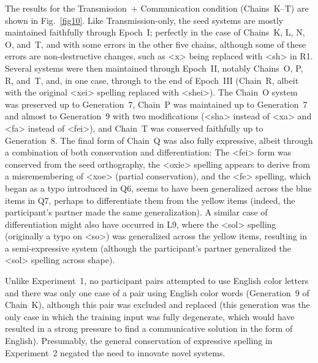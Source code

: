 \documentclass[doc,biblatex]{apa7}
\begin{document}
The results for the Transmission~+ Communication condition (Chains~K--T) are shown in Fig.~\ref{fig10}. Like Transmission-only, the seed systems are mostly maintained faithfully through Epoch~I; perfectly in the case of Chains~K, L, N, O, and~T, and with some errors in the other five chains, although some of these errors are non-destructive changes, such as <x> being replaced with <sh> in R1. Several systems were then maintained through Epoch~II, notably Chains~O, P, R, and~T, and, in one case, through to the end of Epoch~III (Chain~R, albeit with the original <xei> spelling replaced with <shei>). The Chain~O system was preserved up to Generation~7, Chain~P was maintained up to Generation~7 and almost to Generation~9 with two modifications (<sha> instead of <xa> and <fa> instead of <fei>), and Chain~T was conserved faithfully up to Generation~8. The final form of Chain~Q was also fully expressive, albeit through a combination of both conservation and differentiation: The <fei> form was conserved from the seed orthography, the <oxie> spelling appears to derive from a misremembering of <xoe> (partial conservation), and the <fe> spelling, which began as a typo introduced in Q6, seems to have been generalized across the blue items in Q7, perhaps to differentiate them from the yellow items (indeed, the participant's partner made the same generalization). A similar case of differentiation might also have occurred in L9, where the <sol> spelling (originally a typo on <so>) was generalized across the yellow items, resulting in a semi-expressive system (although the participant's partner generalized the <sol> spelling across shape).

Unlike Experiment~1, no participant pairs attempted to use English color letters and there was only one case of a pair using English color words (Generation~9 of Chain~K), although this pair was excluded and replaced (this generation was the only case in which the training input was fully degenerate, which would have resulted in a strong pressure to find a communicative solution in the form of English). Presumably, the general conservation of expressive spelling in Experiment~2 negated the need to innovate novel systems.
\end{document}
